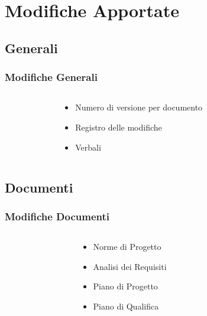 \section{Modifiche Apportate}
\subsection{Generali}

\begin{frame}
	\frametitle{Modifiche Generali}
	
		
		\begin{columns}
			\begin{column}{0.2\textwidth}
				
			\end{column}
			
			\begin{column}{0.4\textwidth}
				\begin{itemize}
					\item Numero di versione per documento
					\item Registro delle modifiche
					\item Verbali
				
				\end{itemize}
			\end{column}
			
			\begin{column}{0.2\textwidth}
				
			\end{column}
		\end{columns}
		
		
\end{frame}


\subsection{Documenti}

\begin{frame}
	\frametitle{Modifiche Documenti}
	
	
	\begin{columns}
		\begin{column}{0.2\textwidth}
			
		\end{column}
		
		\begin{column}{0.4\textwidth}
			\begin{itemize}
				\item Norme di Progetto
				\item Analisi dei Requisiti
				\item Piano di Progetto
				\item Piano di Qualifica
				
			\end{itemize}
		\end{column}
		
		\begin{column}{0.2\textwidth}
			
		\end{column}
	\end{columns}
	
\end{frame}